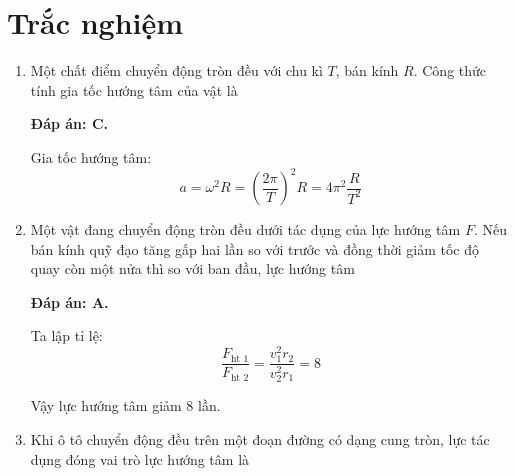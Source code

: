\whiteBGstarBegin
\setcounter{section}{0}
\section{Trắc nghiệm}
\begin{enumerate}[label=\bfseries Câu \arabic*:]
	
	\item {}
	
	\cauhoi
	{Một chất điểm chuyển động tròn đều với chu kì $T$, bán kính $R$. Công thức tính gia tốc hướng tâm của vật là
	}
	
	\loigiai
	{	\textbf{Đáp án: C.}
		
	Gia tốc hướng tâm:
	$$a=\omega^2 R = \left(\dfrac{2\pi}{T}\right)^2 R = 4 \pi ^2 \dfrac{R}{T^2}$$
	}

	\item {}
	
	\cauhoi
	{Một vật đang chuyển động tròn đều dưới tác dụng của lực hướng tâm $F$. Nếu bán kính quỹ đạo tăng gấp hai lần so với trước và đồng thời giảm tốc độ quay còn một nửa thì so với ban đầu, lực hướng tâm
	}
	
	\loigiai
	{	\textbf{Đáp án: A.}
		
	Ta lập tỉ lệ:
	$$\dfrac{F_\text{ht 1}}{F_\text{ht 2}} = \dfrac{v_1 ^2 r_2}{v_2 ^2 r_1} = 8$$
	
	Vậy lực hướng tâm giảm 8 lần.
	}
	\item {}
	
	\cauhoi
	{Khi ô tô chuyển động đều trên một đoạn đường có dạng cung tròn, lực tác dụng đóng vai trò lực hướng tâm là
	}
	

\end{enumerate}
